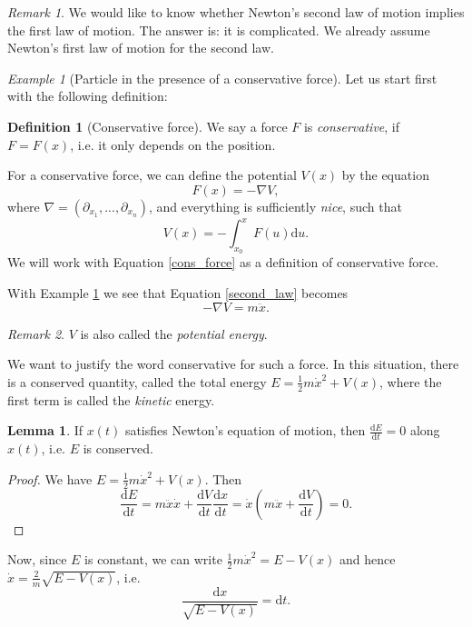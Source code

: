 \documentclass[12pt]{amsart}
\numberwithin{equation}{section}
\theoremstyle{plain}
\theoremstyle{definition}
\newtheorem{defn}{Definition}[subsection]
\newtheorem{lem}{Lemma}[subsection]
\theoremstyle{remark}
\newtheorem{rem}{Remark}[subsection]
\newtheorem{ex}{Example}[subsection]
\newcommand{\dd}{{\mathrm{d}}}
\begin{document}
\begin{rem}
We would like to know whether Newton's second law of motion implies the first law of motion. The answer is: it is complicated. We already assume Newton's first law of motion for the second law. 
\end{rem}

\begin{ex}[Particle in the presence of a conservative force]
\label{part_cons_force}
Let us start first with the following definition:

\begin{defn}[Conservative force]
We say a force $F$ is \emph{conservative}, if $F=F(x)$, i.e. it only depends on the position.
\end{defn}

For a conservative force, we can define the potential $V(x)$ by the equation
\begin{equation}
\label{cons_force}
F(x)=-\nabla V,
\end{equation}
where $\nabla=(\partial_{x_1},...,\partial_{x_n})$, and everything is sufficiently \emph{nice}, such that 
\[
V(x)=-\int_{x_0}^xF(u)\dd u.
\]
We will work with Equation \eqref{cons_force} as a definition of conservative force. 
\end{ex}
With Example \ref{part_cons_force} we see that Equation \eqref{second_law} becomes 
\begin{equation}
\label{pot_second_law}
-\nabla V=m\ddot{x}.
\end{equation}
\begin{rem}
$V$ is also called the \emph{potential energy}.
\end{rem}

We want to justify the word conservative for such a force. In this situation, there is a conserved quantity, called the total energy $E=\frac{1}{2}m\dot{x}^2+V(x)$, where the first term is called the \emph{kinetic} energy. 

\begin{lem}
If $x(t)$ satisfies Newton's equation of motion, then $\frac{\dd E}{\dd t}=0$ along $x(t)$, i.e. $E$ is conserved.
\end{lem}

\begin{proof}
We have $E=\frac{1}{2}m\dot{x}^2+V(x)$. Then 
\[
\frac{\dd E}{\dd t}=m\ddot{x}\dot{x}+\frac{\dd V}{\dd t}\frac{\dd x}{\dd t}=\dot{x}\left(m\ddot{x}+\frac{\dd V}{\dd t}\right)=0.
\]
\end{proof}
Now, since $E$ is constant, we can write $\frac{1}{2}m\dot{x}^2=E-V(x)$ and hence $\dot{x}=\frac{2}{m}\sqrt{E-V(x)}$, i.e. 
\begin{equation}
\label{id1}
\frac{\dd x}{\sqrt{E-V(x)}}=\dd t.
\end{equation}
\end{document}
